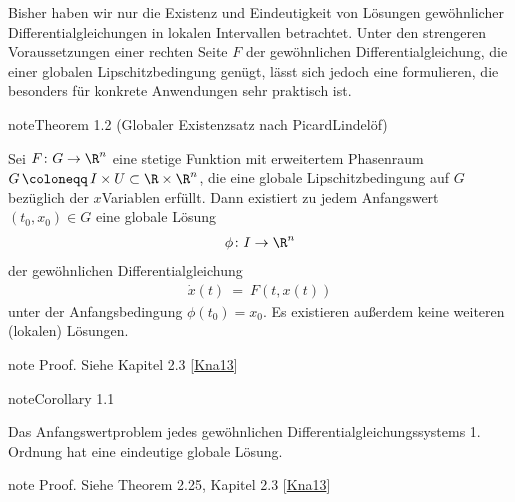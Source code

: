 \documentclass[letterpaper,10pt,german]{jupyterBook}
\begin{document}
\sphinxAtStartPar
Bisher haben wir nur die Existenz und Eindeutigkeit von Lösungen gewöhnlicher Differentialgleichungen in lokalen Intervallen betrachtet.
Unter den strengeren Voraussetzungen einer rechten Seite \(F\) der gewöhnlichen Differentialgleichung, die einer globalen Lipschitzbedingung genügt, lässt sich jedoch eine  formulieren, die besonders für konkrete Anwendungen sehr praktisch ist.
\label{ode/repetition:satz:picardlindeloef}
\begin{sphinxadmonition}{note}{Theorem 1.2 (Globaler Existenzsatz nach Picard\sphinxhyphen{}Lindelöf)}



\sphinxAtStartPar
Sei \(F\colon G\to\R^n\) eine stetige Funktion mit erweitertem Phasenraum \(G \, \coloneqq \, I \times U \subset \R\times\R^n\), die eine globale Lipschitzbedingung auf \(G\) bezüglich der \(x\)\sphinxhyphen{}Variablen erfüllt.
Dann existiert zu jedem Anfangswert \((t_0,x_0) \in G\) eine globale Lösung
\begin{equation*}
\begin{split}\phi \colon I \to \R^n\end{split}
\end{equation*}
\sphinxAtStartPar
der gewöhnlichen Differentialgleichung
\begin{equation*}
\begin{split}\dot{x}(t) \ = \ F(t,x(t))\end{split}
\end{equation*}
\sphinxAtStartPar
unter der Anfangsbedingung \(\phi(t_0)=x_0\).
Es existieren außerdem keine weiteren (lokalen) Lösungen.
\end{sphinxadmonition}

\begin{sphinxadmonition}{note}
\sphinxAtStartPar
Proof. Siehe Kapitel 2.3 {[}\hyperlink{cite.references:id7}{Kna13}{]}
\end{sphinxadmonition}
\label{ode/repetition:cor:eindeutigkeitlinear}
\begin{sphinxadmonition}{note}{Corollary 1.1}



\sphinxAtStartPar
Das Anfangswertproblem jedes  gewöhnlichen Differentialgleichungssystems 1. Ordnung hat eine eindeutige globale Lösung.
\end{sphinxadmonition}

\begin{sphinxadmonition}{note}
\sphinxAtStartPar
Proof. Siehe Theorem 2.25, Kapitel 2.3 {[}\hyperlink{cite.references:id7}{Kna13}{]}
\end{sphinxadmonition}
\end{document}
